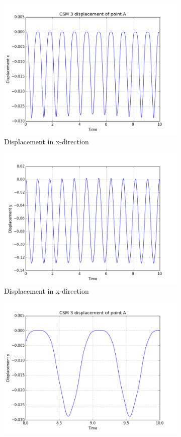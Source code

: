 \begin{figure}[h!] 
  \begin{subfigure}[b]{0.5\linewidth}
    \centering
    \includegraphics[width=0.75\linewidth]{./Verification_Validation//Hron_Turek/dis_x.png} 
    \caption{Displacement in x-direction} 
    \label{fig7:a} 
    \vspace{4ex}
  \end{subfigure}%
  \begin{subfigure}[b]{0.5\linewidth}
    \centering
    \includegraphics[width=0.75\linewidth]{./Verification_Validation//Hron_Turek/dis_y.png} 
    \caption{Displacement in x-direction} 
    \label{fig7:b} 
    \vspace{4ex}
  \end{subfigure} 
  \begin{subfigure}[b]{0.5\linewidth}
    \centering
    \includegraphics[width=0.75\linewidth]{./Verification_Validation//Hron_Turek/dis_x_short.png} 

\end{subfigure}
\end{figure}
